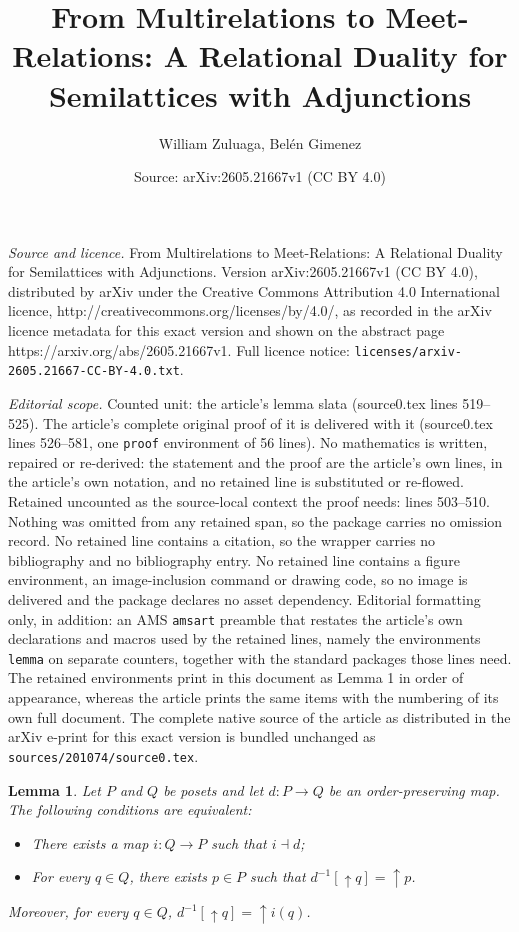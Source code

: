 \documentclass[10pt,a4paper]{amsart}
\title{From Multirelations to Meet-Relations: A Relational Duality for Semilattices with Adjunctions}
\author{William Zuluaga, Bel\'en Gimenez}
\date{Source: arXiv:2605.21667v1 (CC BY 4.0)}
\newtheorem{lemma}{Lemma}
\begin{document}
\maketitle

\noindent\emph{Source and licence.} From Multirelations to Meet-Relations: A Relational Duality for Semilattices with Adjunctions. Version arXiv:2605.21667v1 (CC BY 4.0), distributed by arXiv under the Creative Commons Attribution 4.0 International licence, http://creativecommons.org/licenses/by/4.0/, as recorded in the arXiv licence metadata for this exact version and shown on the abstract page https://arxiv.org/abs/2605.21667v1. Full licence notice: \texttt{licenses/arxiv-2605.21667-CC-BY-4.0.txt}.\par\smallskip

\noindent\textit{Editorial scope.} Counted unit: the article's lemma slata (source0.tex lines 519--525). The article's complete original proof of it is delivered with it (source0.tex lines 526--581, one \texttt{proof} environment of 56 lines). No mathematics is written, repaired or re-derived: the statement and the proof are the article's own lines, in the article's own notation, and no retained line is substituted or re-flowed.  Retained uncounted as the source-local context the proof needs: lines 503--510.  Nothing was omitted from any retained span, so the package carries no omission record.  No retained line contains a citation, so the wrapper carries no bibliography and no bibliography entry.  No retained line contains a figure environment, an image-inclusion command or drawing code, so no image is delivered and the package declares no asset dependency.  Editorial formatting only, in addition: an AMS \texttt{amsart} preamble that restates the article's own declarations and macros used by the retained lines, namely the environments \texttt{lemma} on separate counters, together with the standard packages those lines need.  The retained environments print in this document as Lemma 1 in order of appearance, whereas the article prints the same items with the numbering of its own full document.  The complete native source of the article as distributed in the arXiv e-print for this exact version is bundled unchanged as \texttt{sources/201074/source0.tex}.
\begin{lemma}\label{existencia izquierda}
Let $P$ and $Q$ be posets and let $d \colon P \to Q$ be an order-preserving map. The following conditions are equivalent:
\begin{itemize}
    \item[(i)] There exists a map $i \colon Q \to P$ such that $i \dashv d$;
    \item[(ii)] For every $q \in Q$, there exists $p \in P$ such that $d^{-1}[\uparrow q]=\uparrow p$.
\end{itemize}
Moreover, for every $q\in Q$, $d^{-1}[\uparrow q]=\uparrow i(q)$.
\end{lemma}
\end{document}
